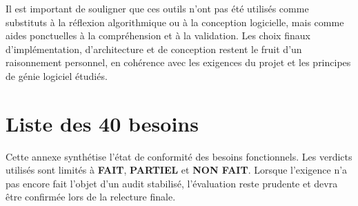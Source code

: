 \documentclass[a4paper]{article}
\begin{document}
Il est important de souligner que ces outils n'ont pas été utilisés comme
substituts à la réflexion algorithmique ou à la conception logicielle, mais
comme aides ponctuelles à la compréhension et à la validation. Les choix finaux
d'implémentation, d'architecture et de conception restent le fruit d'un
raisonnement personnel, en cohérence avec les exigences du projet et les
principes de génie logiciel étudiés.


\nocite{*}



\appendix

\section{Liste des 40 besoins}

\small
\setlength{\LTpre}{0pt}
\setlength{\LTpost}{0pt}
\renewcommand{\arraystretch}{1.15}

Cette annexe synthétise l'état de conformité des besoins fonctionnels. Les
verdicts utilisés sont limités à \textbf{FAIT}, \textbf{PARTIEL} et
\textbf{NON FAIT}. Lorsque l'exigence n'a pas encore fait l'objet d'un audit
stabilisé, l'évaluation reste prudente et devra être confirmée lors de la
relecture finale.
\end{document}
